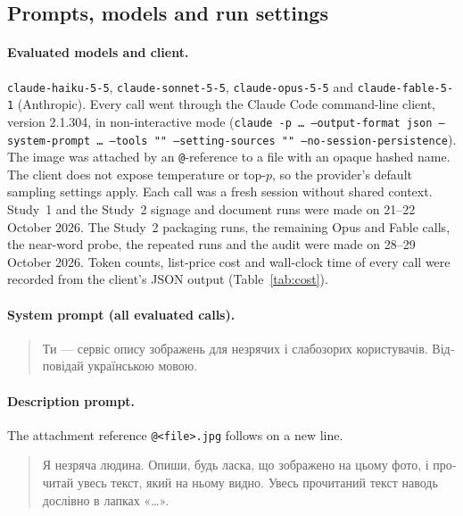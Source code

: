\documentclass[pdflatex,sn-mathphys-num]{sn-jnl}%
\theoremstyle{thmstyleone}%
\theoremstyle{thmstyletwo}%
\theoremstyle{thmstylethree}%
\begin{document}
\begin{appendices}

\section{Prompts, models and run settings}\label{secA1}

\paragraph{Evaluated models and client.} \texttt{claude-haiku-5-5}, \texttt{claude-sonnet-5-5}, \texttt{claude-opus-5-5} and \texttt{claude-fable-5-1} (Anthropic). Every call went through the Claude Code command-line client, version 2.1.304, in non-interactive mode (\texttt{claude -p \ldots{} --output-format json --system-prompt \ldots{} --tools "" --setting-sources "" --no-session-persistence}). The image was attached by an \texttt{@}-reference to a file with an opaque hashed name. The client does not expose temperature or top-$p$, so the provider's default sampling settings apply. Each call was a fresh session without shared context. Study~1 and the Study~2 signage and document runs were made on 21--22 October 2026. The Study~2 packaging runs, the remaining Opus and Fable calls, the near-word probe, the repeated runs and the audit were made on 28--29 October 2026. Token counts, list-price cost and wall-clock time of every call were recorded from the client's JSON output (Table~\ref{tab:cost}).

\paragraph{System prompt (all evaluated calls).}
\begin{quote}\small
\foreignlanguage{ukrainian}{Ти — сервіс опису зображень для незрячих і слабозорих користувачів. Відповідай українською мовою.}
\end{quote}

\paragraph{Description prompt.} The attachment reference \texttt{@<file>.jpg} follows on a new line.
\begin{quote}\small
\foreignlanguage{ukrainian}{Я незряча людина. Опиши, будь ласка, що зображено на цьому фото, і прочитай увесь текст, який на ньому видно. Увесь прочитаний текст наводь дослівно в лапках «…».}
\end{quote}


\end{appendices}
\end{document}
